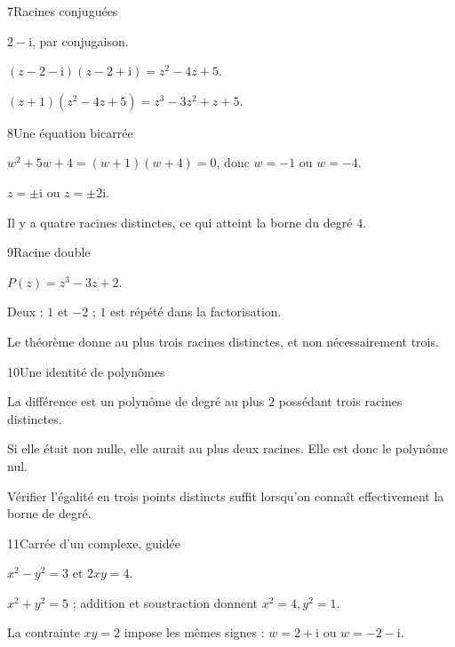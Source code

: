 \begin{corrige}{7}{Racines conjuguées}
\begin{questions}
\item $2-\mathrm i$, par conjugaison.
\item $(z-2-\mathrm i)(z-2+\mathrm i)=z^2-4z+5$.
\item $(z+1)(z^2-4z+5)=z^3-3z^2+z+5$.
\end{questions}
\end{corrige}
\begin{corrige}{8}{Une équation bicarrée}
\begin{questions}
\item $w^2+5w+4=(w+1)(w+4)=0$, donc $w=-1$ ou $w=-4$.
\item $z=\pm\mathrm i$ ou $z=\pm2\mathrm i$.
\item Il y a quatre racines distinctes, ce qui atteint la borne du degré $4$.
\end{questions}
\end{corrige}
\begin{corrige}{9}{Racine double}
\begin{questions}
\item $P(z)=z^3-3z+2$.
\item Deux : $1$ et $-2$ ; $1$ est répété dans la factorisation.
\item Le théorème donne au plus trois racines distinctes, et non nécessairement trois.
\end{questions}
\end{corrige}
\begin{corrige}{10}{Une identité de polynômes}
\begin{questions}
\item La différence est un polynôme de degré au plus $2$ possédant trois racines distinctes.
\item Si elle était non nulle, elle aurait au plus deux racines. Elle est donc le polynôme nul.
\item Vérifier l’égalité en trois points distincts suffit lorsqu’on connaît effectivement la borne de degré.
\end{questions}
\end{corrige}
\begin{corrige}{11}{Carrée d’un complexe, guidée}
\begin{questions}
\item $x^2-y^2=3$ et $2xy=4$.
\item $x^2+y^2=5$ ; addition et soustraction donnent $x^2=4,y^2=1$.
\item La contrainte $xy=2$ impose les mêmes signes : $w=2+\mathrm i$ ou $w=-2-\mathrm i$.
\end{questions}
\end{corrige}
